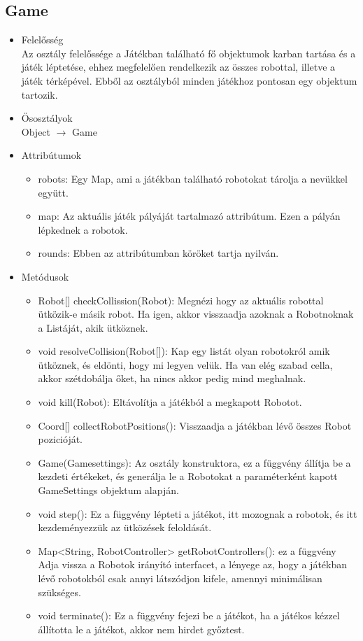 \subsection{Game}
\begin{itemize}
	\item Felelősség\\
	Az osztály felelőssége a Játékban található fő objektumok karban tartása és a játék léptetése, ehhez megfelelően rendelkezik az összes robottal, illetve a játék térképével. Ebből az osztályból minden játékhoz pontosan egy objektum tartozik.
	\item Ősosztályok\\
	Object $\rightarrow$ Game
	\item Attribútumok\\
	\begin{itemize}
		\item robots: Egy Map, ami a játékban található robotokat tárolja a nevükkel együtt.
		\item map: Az aktuális játék pályáját tartalmazó attribútum. Ezen a pályán lépkednek a robotok.
		\item rounds: Ebben az attribútumban köröket tartja nyilván.
	\end{itemize}
	\item Metódusok\\
	\begin{itemize}
		\item Robot[] checkCollission(Robot): Megnézi hogy az aktuális robottal ütközik-e másik robot. Ha igen, akkor visszaadja azoknak a Robotnoknak a Listáját, akik ütköznek.
		\item void resolveCollision(Robot[]): Kap egy listát olyan robotokról amik ütköznek, és eldönti, hogy mi legyen velük. Ha van elég szabad cella, akkor szétdobálja őket, ha nincs akkor pedig mind meghalnak.
		\item void kill(Robot): Eltávolítja a játékból a megkapott Robotot.
		\item Coord[] collectRobotPositions(): Visszaadja a játékban lévő összes Robot pozicióját.
		\item Game(Gamesettings): Az osztály konstruktora, ez a függvény állítja be a kezdeti értékeket, és generálja le a Robotokat a paraméterként kapott GameSettings objektum alapján.
		\item void step(): Ez a függvény lépteti a játékot, itt mozognak a robotok, és itt kezdeményezzük az ütközések feloldását.
		\item Map<String, RobotController> getRobotControllers(): ez a függvény Adja vissza a Robotok irányító interfacet, a lényege az, hogy a játékban lévő robotokból csak annyi látszódjon kifele, amennyi minimálisan szükséges.
		\item void terminate(): Ez a függvény fejezi be a játékot, ha a játékos kézzel állította le a játékot, akkor nem hirdet győztest.
	\end{itemize}
\end{itemize}


